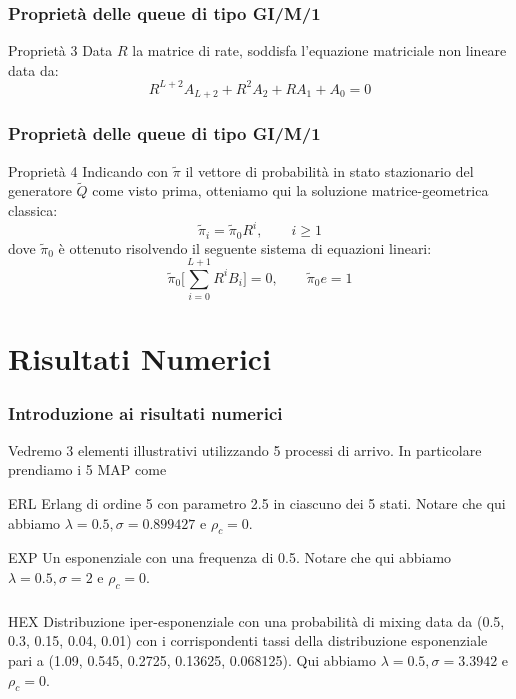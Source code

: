 \documentclass{beamer}
\begin{document}
\begin{frame}
    \frametitle{Proprietà delle queue di tipo GI/M/1}
    \begin{block}{Proprietà 3}
        Data $R$ la matrice di rate, soddisfa l'equazione matriciale non lineare data da:
        $$ R^{L+2} A_{L+2} + R^2A_2 + RA_1 + A_0 = 0 $$
    \end{block}
\end{frame}


\begin{frame}
    \frametitle{Proprietà delle queue di tipo GI/M/1}
    \begin{block}{Proprietà 4}
        Indicando con $\widetilde{\pi}$ il vettore di probabilità in stato stazionario del generatore $\widetilde{Q}$ come visto prima, otteniamo qui la soluzione matrice-geometrica classica:
        $$ \widetilde{\pi}_i = \widetilde{\pi}_0R^i, \qquad i \geq 1 $$
        dove $\widetilde{\pi}_0$ è ottenuto risolvendo il seguente sistema di equazioni lineari:
        $$ \widetilde{\pi}_0\Bigg[ \sum_{i=0}^{L+1} R^iB_i \Bigg] = 0, \qquad \widetilde{\pi}_0e = 1 $$
    \end{block}
\end{frame}


\section{Risultati Numerici}
\begin{frame}
    \frametitle{Introduzione ai risultati numerici}
    Vedremo 3 elementi illustrativi utilizzando 5 processi di arrivo. In particolare prendiamo i 5 MAP come
    \begin{block}{ERL}
        Erlang di ordine 5 con parametro 2.5 in ciascuno dei 5 stati. Notare che qui abbiamo $\lambda = 0.5, \sigma = 0.899427$ e $\rho_c = 0$.
    \end{block}
    \begin{block}{EXP}
        Un esponenziale con una frequenza di 0.5. Notare che qui abbiamo $\lambda = 0.5, \sigma = 2$ e $\rho_c = 0$.
    \end{block}
\end{frame}


\begin{frame}
    \frametitle{}
    \begin{block}{HEX}
        Distribuzione iper-esponenziale con una probabilità di mixing data da (0.5, 0.3, 0.15, 0.04, 0.01) con i corrispondenti tassi della distribuzione esponenziale pari a (1.09, 0.545, 0.2725, 0.13625, 0.068125). Qui abbiamo $\lambda = 0.5, \sigma = 3.3942$ e $\rho_c = 0$.
    \end{block}
\end{frame}
\end{document}
